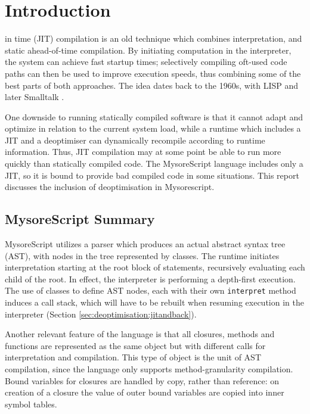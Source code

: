 \documentclass[journal,comsoc]{IEEEtran}
\begin{document}
\section{Introduction}

 in time (JIT) compilation is an old technique which combines interpretation, and static ahead-of-time compilation. By initiating computation in the interpreter, the system can achieve fast startup times; selectively compiling oft-used code paths can then be used to improve execution speeds, thus combining some of the best parts of both approaches. The idea dates back to the 1960s, with LISP and later Smalltalk \cite{aycock2003brief} \cite{mccarthy1960recursive}.

One downside to running statically compiled software is that it cannot adapt and optimize in relation to the current system load, while a runtime which includes a JIT and a deoptimiser can dynamically recompile according to runtime information. Thus, JIT compilation may at some point be able to run more quickly than statically compiled code. The MysoreScript language includes only a JIT, so it is bound to provide bad compiled code in some situations. This report discusses the inclusion of deoptimisation in Mysorescript.


\subsection{MysoreScript Summary}
MysoreScript utilizes a parser which produces an actual abstract syntax tree (AST), with nodes in the tree represented by classes. The runtime initiates interpretation starting at the root block of statements, recursively evaluating each child of the root. In effect, the interpreter is performing a depth-first execution. The use of classes to define AST nodes, each with their own \lstinline|interpret| method induces a call stack, which will have to be rebuilt when resuming execution in the interpreter (Section \ref{sec:deoptimisation:jitandback}).

Another relevant feature of the language is that all closures, methods and functions are represented as the same object but with different calls for interpretation and compilation. This type of object is the unit of AST compilation, since the language only supports method-granularity compilation. Bound variables for closures are handled by copy, rather than reference: on creation of a closure the value of outer bound variables are copied into inner symbol tables.
\end{document}

